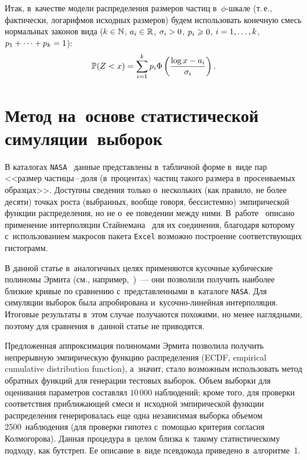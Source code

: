 \begin{multicols}{2}
\renewcommand{\tablename}{\protect\bf Таблица}

Итак, в~качестве модели распределения размеров частиц в~$\phi$-шка\-ле 
(т.\,е., фактически, логарифмов исходных размеров) будем использовать 
конечную смесь нормальных законов вида ($k\hm\in\mathbb{N}$, 
$a_i\hm\in\mathbb{R}$, $\sigma_i\hm>0$, $p_i\hm\geqslant 0$,
$i\hm=1,\ldots,k$, $p_1+\cdots+p_k\hm=1$):
\begin{equation}
\label{LogPhi}
{\mathbb P}(Z<x)=\sum\limits_{i=1}^k p_i\Phi\left(\displaystyle\frac{\displaystyle \log
x-a_i\mathstrut}{\displaystyle \sigma_i\mathstrut}\right).
\end{equation}


\section{Метод на~основе статистической симуляции~выборок}

В каталогах \verb"NASA"~\cite{Graf1993} данные представлены в~таб\-лич\-ной 
форме в~виде пар <<размер  
час\-ти\-цы\,--\,до\-ля (в~процентах) частиц такого размера 
в~про\-сеи\-ва\-емых образцах>>. Доступны сведения только о~нескольких (как 
правило, не более десяти) точках роста (выбранных, вообще говоря, 
бессистемно) эмпирической функции распределения, но не о~ее поведении 
между ними. В~работе~\cite{Graf1993} описано применение 
интерполяции Стайнемана~\cite{Stineman1980} для их соединения, благодаря которому
с~использованием макросов пакета \verb"Excel" возможно построение
 соответствующих  гистограмм.

В данной статье в~аналогичных целях применяются кусочные кубические 
полиномы Эрмита (см., например,~\cite{Fritsch1980})~--- они позволили 
получить наиболее близкие кривые по сравнению с~пред\-став\-лен\-ны\-ми 
в~каталоге \verb"NASA". Для симуляции выборок была апробирована 
и~кусочно-линейная интерполяция. Итоговые результаты в~этом случае 
получаются похожими, но менее наглядными, поэтому для сравнения в~данной 
статье не при\-во\-дятся.
{ %

}

Предложенная аппроксимация полиномами Эрмита позволила получить 
непрерывную эмпирическую функцию распределения (ECDF,
empirical cumulative distribution function), а~значит, стало 
возможным использовать метод обратных функций для генерации тестовых 
выборок. Объем выборки для оценивания параметров составлял $10\,000$ 
наблюдений; кроме того, для проверки соответствия приближающей смеси 
и~исходной эмпирической функции распределения генерировалась еще одна 
независимая выборка объемом 2500~наблюдения (для проверки гипотез 
с~помощью критерия согласия Колмогорова). 
%
Данная процедура в~целом близка 
к~такому статистическому подходу, как бутстреп. Ее описание в~виде 
псевдокода приведено в~алгоритме~1.





\end{multicols}
